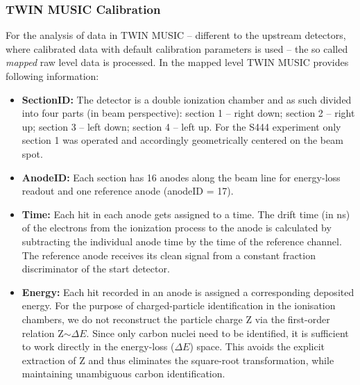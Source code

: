 \subsubsection{TWIN MUSIC Calibration}
For the analysis of data in TWIN MUSIC -- different to the upstream detectors, where calibrated data with default calibration parameters is used -- the so called \textit{mapped} raw level data is processed. In the mapped level TWIN MUSIC provides following information:
\begin{itemize}
\itemsep0em 
\item \textbf{SectionID:} The detector is a double ionization chamber and as such divided into four parts (in beam perspective): section 1 -- right down; section 2 -- right up; section 3 -- left down; section 4 -- left up. For the S444 experiment only section 1 was operated and accordingly geometrically centered on the beam spot.
\item \textbf{AnodeID:} Each section has 16 anodes along the beam line for energy-loss readout and one reference anode (anodeID = 17).
\item \textbf{Time:} Each hit in each anode gets assigned to a time. The drift time (in ns) of the electrons from the ionization process to the anode is calculated by subtracting the individual anode time by the time of the reference channel. The reference anode receives its clean signal from a constant fraction discriminator of the start detector.
\item \textbf{Energy:} Each hit recorded in an anode is assigned a corresponding deposited energy. For the purpose of charged-particle identification in the ionisation chambers, we do not reconstruct the particle charge Z via the first-order relation Z$\sim\Delta E$. Since only carbon nuclei need to be identified, it is sufficient to work directly in the energy-loss ($\Delta E$) space. This avoids the explicit extraction of Z and thus eliminates the square-root transformation, while maintaining unambiguous carbon identification.
\end{itemize}
